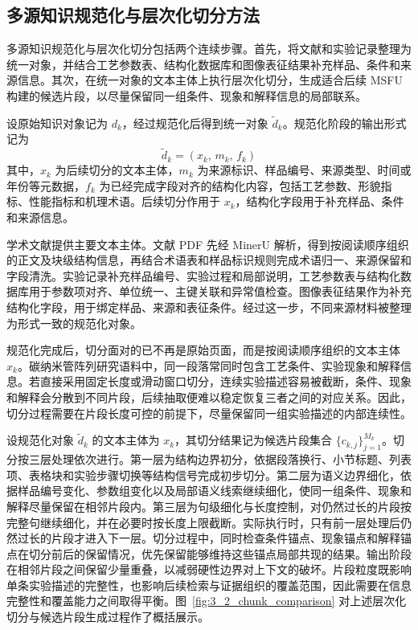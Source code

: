 \subsection{多源知识规范化与层次化切分方法}

多源知识规范化与层次化切分包括两个连续步骤。首先，将文献和实验记录整理为统一对象，并结合工艺参数表、结构化数据库和图像表征结果补充样品、条件和来源信息。其次，在统一对象的文本主体上执行层次化切分，生成适合后续 MSFU 构建的候选片段，以尽量保留同一组条件、现象和解释信息的局部联系。

设原始知识对象记为 $d_k$，经过规范化后得到统一对象 $\tilde{d}_k$。规范化阶段的输出形式记为
\begin{equation}
    \tilde{d}_k=(x_k,\, m_k,\, f_k)
\end{equation}
其中，$x_k$ 为后续切分的文本主体，$m_k$ 为来源标识、样品编号、来源类型、时间或年份等元数据，$f_k$ 为已经完成字段对齐的结构化内容，包括工艺参数、形貌指标、性能指标和机理术语。后续切分作用于 $x_k$，结构化字段用于补充样品、条件和来源信息。

学术文献提供主要文本主体。文献 PDF 先经 MinerU 解析\cite{Wang2024MinerU}，得到按阅读顺序组织的正文及块级结构信息，再结合术语表和样品标识规则完成术语归一、来源保留和字段清洗。实验记录补充样品编号、实验过程和局部说明，工艺参数表与结构化数据库用于参数项对齐、单位统一、主键关联和异常值检查。图像表征结果作为补充结构化字段，用于绑定样品、来源和表征条件。经过这一步，不同来源材料被整理为形式一致的规范化对象。

规范化完成后，切分面对的已不再是原始页面，而是按阅读顺序组织的文本主体 $x_k$。碳纳米管阵列研究语料中，同一段落常同时包含工艺条件、实验现象和解释信息。若直接采用固定长度或滑动窗口切分，连续实验描述容易被截断，条件、现象和解释会分散到不同片段，后续抽取便难以稳定恢复三者之间的对应关系。因此，切分过程需要在片段长度可控的前提下，尽量保留同一组实验描述的内部连续性。

设规范化对象 $\tilde{d}_k$ 的文本主体为 $x_k$，其切分结果记为候选片段集合 $\{c_{k,j}\}_{j=1}^{M_k}$。切分按三层处理依次进行。第一层为结构边界初分，依据段落换行、小节标题、列表项、表格块和实验步骤切换等结构信号完成初步切分。第二层为语义边界细化，依据样品编号变化、参数组变化以及局部语义线索继续细化，使同一组条件、现象和解释尽量保留在相邻片段内。第三层为句级细化与长度控制，对仍然过长的片段按完整句继续细化，并在必要时按长度上限截断。实际执行时，只有前一层处理后仍然过长的片段才进入下一层。切分过程中，同时检查条件锚点、现象锚点和解释锚点在切分前后的保留情况，优先保留能够维持这些锚点局部共现的结果。输出阶段在相邻片段之间保留少量重叠，以减弱硬性边界对上下文的破坏。片段粒度既影响单条实验描述的完整性，也影响后续检索与证据组织的覆盖范围，因此需要在信息完整性和覆盖能力之间取得平衡。图~\ref{fig:3_2_chunk_comparison} 对上述层次化切分与候选片段生成过程作了概括展示。

